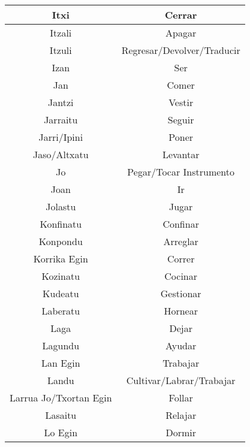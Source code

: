 \documentclass[11pt, a4paper]{article}
\begin{document}
\begin{longtable}{cc}
\hline
Itxi                       & Cerrar                      \\ 
\hline
Itzali                     & Apagar                      \\ 
\hline
Itzuli                     & Regresar/Devolver/Traducir  \\ 
\hline
Izan                       & Ser                         \\ 
\hline
Jan                        & Comer                       \\ 
\hline
Jantzi                     & Vestir                      \\ 
\hline
Jarraitu                   & Seguir                      \\ 
\hline
Jarri/Ipini                & Poner                       \\ 
\hline
Jaso/Altxatu               & Levantar                    \\ 
\hline
Jo                         & Pegar/Tocar Instrumento     \\ 
\hline
Joan                       & Ir                          \\ 
\hline
Jolastu                    & Jugar                       \\ 
\hline
Konfinatu                  & Confinar                    \\ 
\hline
Konpondu                   & Arreglar                    \\ 
\hline
Korrika Egin               & Correr                      \\ 
\hline
Kozinatu                   & Cocinar                     \\ 
\hline
Kudeatu                    & Gestionar                   \\ 
\hline
Laberatu                   & Hornear                     \\ 
\hline
Laga                       & Dejar                       \\ 
\hline
Lagundu                    & Ayudar                      \\ 
\hline
Lan Egin                   & Trabajar                    \\ 
\hline
Landu                      & Cultivar/Labrar/Trabajar    \\ 
\hline
Larrua Jo/Txortan Egin     & Follar                      \\ 
\hline
Lasaitu                    & Relajar                     \\ 
\hline
Lo Egin                    & Dormir                      \\ 

\end{longtable}
\end{document}
